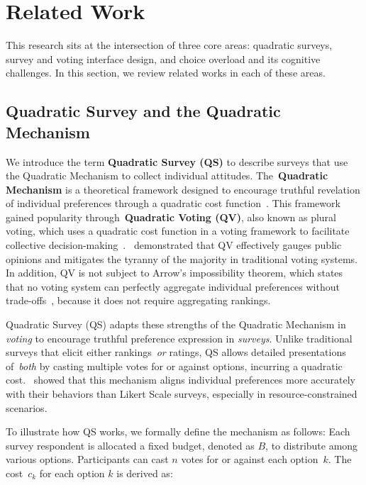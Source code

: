 \section{Related Work}
\label{sec:relatedWorks}
This research sits at the intersection of three core areas: quadratic surveys, survey and voting interface design, and choice overload and its cognitive challenges. In this section, we review related works in each of these areas.

\subsection{Quadratic Survey and the Quadratic Mechanism}
We introduce the term \textbf{Quadratic Survey (QS)} to describe surveys that use the Quadratic Mechanism to collect individual attitudes. The~\textbf{Quadratic Mechanism} is a theoretical framework designed to encourage truthful revelation of individual preferences through a quadratic cost function~\cite{grovesOptimalAllocationPublic1977}. This framework gained popularity through~\textbf{Quadratic Voting (QV)}, also known as plural voting, which uses a quadratic cost function in a voting framework to facilitate collective decision-making~\cite{lalley2016quadratic}.~\textcite{quarfoot2017quadratic} demonstrated that QV effectively gauges public opinions and mitigates the tyranny of the majority in traditional voting systems. In addition, QV is not subject to Arrow's impossibility theorem, which states that no voting system can perfectly aggregate individual preferences without trade-offs~\cite{morreau2014arrow}, because it does not require aggregating rankings.  

Quadratic Survey (QS) adapts these strengths of the Quadratic Mechanism in \textit{voting} to encourage truthful preference expression in \textit{surveys}. Unlike traditional surveys that elicit either rankings~\textit{or} ratings, QS allows detailed presentations of~\textit{both} by casting multiple votes for or against options, incurring a quadratic cost.~\textcite{chengCanShowWhat2021} showed that this mechanism aligns individual preferences more accurately with their behaviors than Likert Scale surveys, especially in resource-constrained scenarios.

To illustrate how QS works, we formally define the mechanism as follows: Each survey respondent is allocated a fixed budget, denoted as $B$, to distribute among various options. Participants can cast $n$ votes for or against each option~$k$. The cost~$c_k$ for each option $k$ is derived as:

